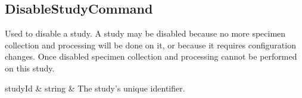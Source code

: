 \subsection*{DisableStudyCommand}

Used to disable a study. A study may be disabled because no more specimen
collection and processing will be done on it, or because it requires
configuration changes. Once disabled specimen collection and processing cannot
be performed on this study.

\begin{commandparmtable}

  studyId & string & The study's unique identifier.\\

\end{commandparmtable}






